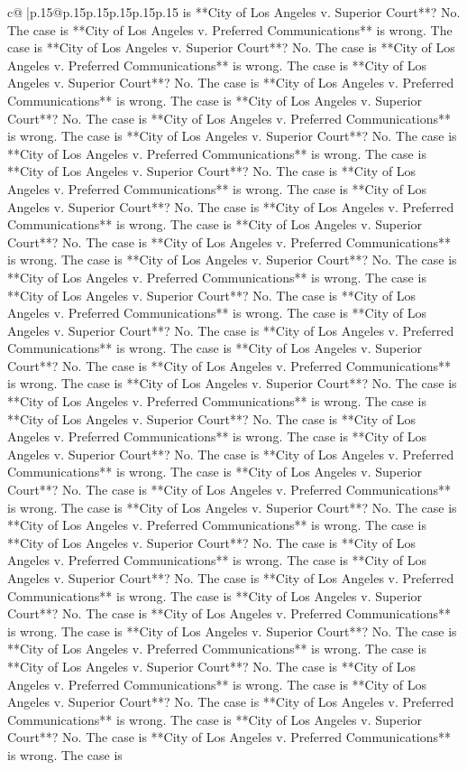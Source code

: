 \documentclass{article}
\begin{document}
{\begin{supertabular}{c@{$\;$}|p{.15\linewidth}@{}p{.15\linewidth}p{.15\linewidth}p{.15\linewidth}p{.15\linewidth}p{.15\linewidth}}
{{{is **City of Los Angeles v. Superior Court**? No. The case is **City of Los Angeles v. Preferred Communications** is wrong. The case is **City of Los Angeles v. Superior Court**? No. The case is **City of Los Angeles v. Preferred Communications** is wrong. The case is **City of Los Angeles v. Superior Court**? No. The case is **City of Los Angeles v. Preferred Communications** is wrong. The case is **City of Los Angeles v. Superior Court**? No. The case is **City of Los Angeles v. Preferred Communications** is wrong. The case is **City of Los Angeles v. Superior Court**? No. The case is **City of Los Angeles v. Preferred Communications** is wrong. The case is **City of Los Angeles v. Superior Court**? No. The case is **City of Los Angeles v. Preferred Communications** is wrong. The case is **City of Los Angeles v. Superior Court**? No. The case is **City of Los Angeles v. Preferred Communications** is wrong. The case is **City of Los Angeles v. Superior Court**? No. The case is **City of Los Angeles v. Preferred Communications** is wrong. The case is **City of Los Angeles v. Superior Court**? No. The case is **City of Los Angeles v. Preferred Communications** is wrong. The case is **City of Los Angeles v. Superior Court**? No. The case is **City of Los Angeles v. Preferred Communications** is wrong. The case is **City of Los Angeles v. Superior Court**? No. The case is **City of Los Angeles v. Preferred Communications** is wrong. The case is **City of Los Angeles v. Superior Court**? No. The case is **City of Los Angeles v. Preferred Communications** is wrong. The case is **City of Los Angeles v. Superior Court**? No. The case is **City of Los Angeles v. Preferred Communications** is wrong. The case is **City of Los Angeles v. Superior Court**? No. The case is **City of Los Angeles v. Preferred Communications** is wrong. The case is **City of Los Angeles v. Superior Court**? No. The case is **City of Los Angeles v. Preferred Communications** is wrong. The case is **City of Los Angeles v. Superior Court**? No. The case is **City of Los Angeles v. Preferred Communications** is wrong. The case is **City of Los Angeles v. Superior Court**? No. The case is **City of Los Angeles v. Preferred Communications** is wrong. The case is **City of Los Angeles v. Superior Court**? No. The case is **City of Los Angeles v. Preferred Communications** is wrong. The case is **City of Los Angeles v. Superior Court**? No. The case is **City of Los Angeles v. Preferred Communications** is wrong. The case is **City of Los Angeles v. Superior Court**? No. The case is **City of Los Angeles v. Preferred Communications** is wrong. The case is **City of Los Angeles v. Superior Court**? No. The case is **City of Los Angeles v. Preferred Communications** is wrong. The case is **City of Los Angeles v. Superior Court**? No. The case is **City of Los Angeles v. Preferred Communications** is wrong. The case is **City of Los Angeles v. Superior Court**? No. The case is **City of Los Angeles v. Preferred Communications** is wrong. The case is **City of Los Angeles v. Superior Court**? No. The case is **City of Los Angeles v. Preferred Communications** is wrong. The case is }}}
\end{supertabular}}
\end{document}
